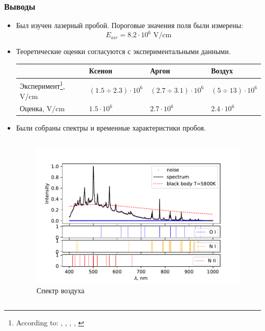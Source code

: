 \documentclass{beamer}
\begin{document}
	\begin{frame}
		\frametitle{Выводы}
		\begin{itemize}
			\item Был изучен лазерный пробой. Пороговые значения поля были измерены:
			$$ E_{air} = 8.2 \cdot 10^6 \text{ V/cm}$$
			\item Теоретические оценки согласуются с экспериментальными данными.
			\footnotesize
			\begin{table}[]
				\begin{tabular}{llll}
					\hline
					& Ксенон            & Аргон            & Воздух              \\ \hline
					Эксперимент\footnote{According to: \cite{raizer}, \cite{argon_threshold}, \cite{xenon_threshold}, \cite{air_breakdown}, \cite{air_threshold}}, V/cm & $(1.5 \div 2.3) \cdot 10^6$ & $(2.7 \div 3.1) \cdot 10^6$ & $(5 \div 13) \cdot 10^6$ \\
					Оценка, V/cm & $1.5 \cdot 10^6$ & $2.7 \cdot 10^6$ & $2.4 \cdot 10^6$ \\ \hline
				\end{tabular}
			\end{table}
			
			\item 
			\normalsize Были собраны спектры и временные характеристики пробоя.
			\begin{columns}
				\begin{figure}
					\centering
					\includegraphics[width=\linewidth]{gen/air_lines.pdf}
					\caption*{Спектр воздуха}
				\end{figure}
				

\end{columns}
\end{itemize}
\end{frame}
\end{document}
